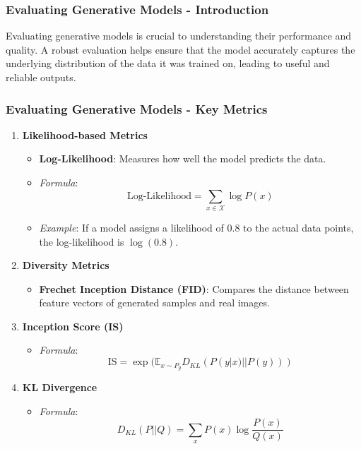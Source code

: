 \documentclass[aspectratio=169]{beamer}
\begin{document}
\begin{frame}[fragile]
    \frametitle{Evaluating Generative Models - Introduction}
    Evaluating generative models is crucial to understanding their performance and quality. A robust evaluation helps ensure that the model accurately captures the underlying distribution of the data it was trained on, leading to useful and reliable outputs.
\end{frame}

\begin{frame}[fragile]
    \frametitle{Evaluating Generative Models - Key Metrics}
    \begin{enumerate}
        \item \textbf{Likelihood-based Metrics}
            \begin{itemize}
                \item \textbf{Log-Likelihood}: Measures how well the model predicts the data. 
                \item \textit{Formula}:
                \begin{equation}
                    \text{Log-Likelihood} = \sum_{x \in \mathcal{X}} \log P(x)
                \end{equation}
                \item \textit{Example}: If a model assigns a likelihood of 0.8 to the actual data points, the log-likelihood is $\log(0.8)$.
            \end{itemize}
        
        \item \textbf{Diversity Metrics}
            \begin{itemize}
                \item \textbf{Frechet Inception Distance (FID)}: Compares the distance between feature vectors of generated samples and real images.
            \end{itemize}
            
        \item \textbf{Inception Score (IS)}
            \begin{itemize}
                \item \textit{Formula}:
                \begin{equation}
                    \text{IS} = \exp(\mathbb{E}_{x \sim P_g} D_{KL}(P(y|x) || P(y)))
                \end{equation}
            \end{itemize}
        
        \item \textbf{KL Divergence}
            \begin{itemize}
                \item \textit{Formula}:
                \begin{equation}
                    D_{KL}(P || Q) = \sum_{x} P(x) \log \frac{P(x)}{Q(x)}
                \end{equation}
            \end{itemize}
    \end{enumerate}
\end{frame}
\end{document}
